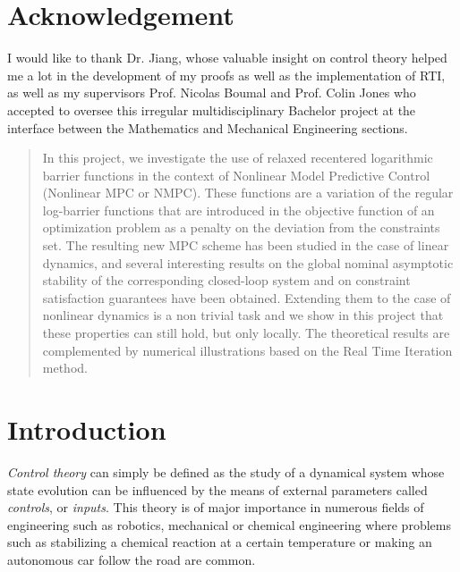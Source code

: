 \documentclass[12pt]{article}
\begin{document}


\clearpage
\thispagestyle{empty}
\section*{Acknowledgement}

I would like to thank Dr. Jiang, whose valuable insight on control theory helped me a lot in the development of my proofs as well as the implementation of RTI, as well as my supervisors Prof. Nicolas Boumal and Prof. Colin Jones who accepted to oversee this irregular multidisciplinary Bachelor project at the interface between the Mathematics and Mechanical Engineering sections.

\clearpage
\thispagestyle{empty}
\begin{abstract}
	In this project, we investigate the use of relaxed recentered logarithmic barrier functions in the context of Nonlinear Model Predictive Control (Nonlinear MPC or NMPC).
	These functions are a variation of the regular log-barrier functions that are introduced in the objective function of an optimization problem as a penalty on the deviation from the constraints set.
	The resulting new MPC scheme has been studied in the case of linear dynamics, and several interesting results on the global nominal asymptotic stability of the corresponding closed-loop system and on constraint satisfaction guarantees have been obtained.
	Extending them to the case of nonlinear dynamics is a non trivial task and we show in this project that these properties can still hold, but only locally.
	The theoretical results are complemented by numerical illustrations based on the Real Time Iteration method.
\end{abstract}
\clearpage
\thispagestyle{empty}
\tableofcontents

\clearpage
{}
\setcounter{page}{1}


\section{Introduction}
\textit{Control theory} can simply be defined as the study of a dynamical system whose state evolution can be influenced by the means of external parameters called \textit{controls}, or \textit{inputs}.
This theory is of major importance in numerous fields of engineering such as robotics, mechanical or chemical engineering where problems such as stabilizing a chemical reaction at a certain temperature or making an autonomous car follow the road are common.
\end{document}

